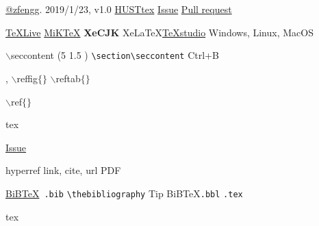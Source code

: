 \documentclass{article}
\begin{document}
\section{ }\seccontent
\begin{description}
	\seccontent
	\item[ ]   \href{https://github.com/zfengg}{@zfengg}.  2019/1/23, v1.0  \href{https://github.com/zfengg/HUSTtex}{HUSTtex}     \href{https://github.com/zfengg/HUSTtex/issues}{Issue}   \href{https://github.com/zfengg/HUSTtex/pulls}{Pull request} 
	
	\item[ ]    \href{http://www.tug.org/texlive/}{TeXLive}  \href{http://miktex.org/}{MiKTeX} \textbf{XeCJK}  Xe\LaTeX    \href{http://texstudio.sourceforge.net/}{TeXstudio}  
	  Windows, Linux, MacOS  
	
	\item[ ]   $\backslash$seccontent (5 1.5 )    
	\verb|\section\seccontent| 
	 Ctrl+B 
	
	\item[ ]  ,  $\backslash$reffig$\lbrace\rbrace$  $\backslash$reftab$\lbrace\rbrace$ 
	
	\item[ ]  $\backslash$ref$\lbrace\rbrace$ 
	
	\item[ ]  tex 
	
	\item[ ]  \href{https://github.com/zfengg/HUSTtex/issues}{Issue} 
	\item[ ]  hyperref link, cite, url PDF 
	
	\item[ ]  \href{http://www.bibtex.org/}{BiB\TeX}\   \verb|.bib|   \verb*|\thebibliography| Tip BiB\TeX   \verb*|.bbl|   \verb*|.tex|  
	
	\item[ ]  
	
	\item[ ]  tex 
\end{description}


\section{ }
\blindtext[4]


\begin{thankpage}

\end{thankpage}
\end{document}
